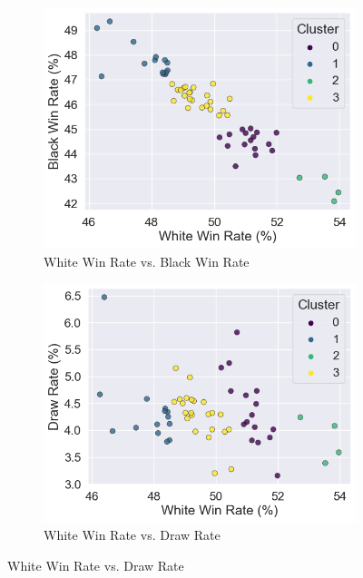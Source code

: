 \documentclass[a4paper, 11pt]{article}
\begin{document}
\begin{figure}[H]
    \centering
    \caption{Base Openings K-Means Clustered by Game Results}
    \begin{subfigure}{0.49\textwidth}
        \centering
        \caption{White Win Rate vs. Black Win Rate}
        \label{fig:baseOpeningsClusteredByGameResultsWhiteVersusBlack}
        \includegraphics[width=\textwidth]{Base Openings Clustered by Game Results (White Win Rate vs Black Win Rate).png}
    \end{subfigure}
    \hfill
    \begin{subfigure}{0.49\textwidth}
        \centering
        \caption{White Win Rate vs. Draw Rate}
        \label{fig:baseOpeningsClusteredByGameResultsWhiteVersusDraw}
        \includegraphics[width=\textwidth]{Base Openings Clustered by Game Results (White Win Rate vs Draw Rate).png}
    \end{subfigure}
\end{figure}
\end{document}
